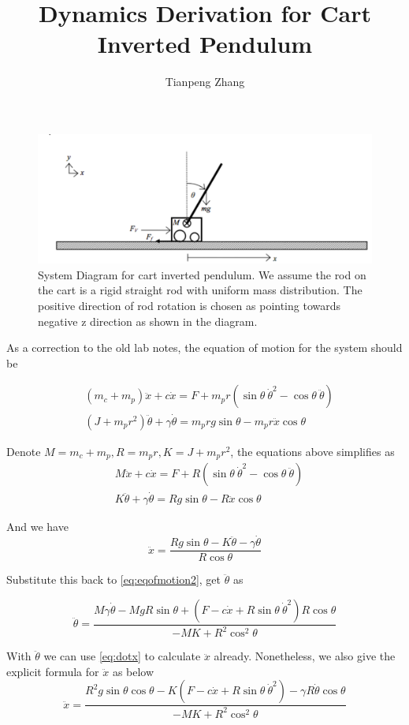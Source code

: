 \documentclass[]{article}
\title{Dynamics Derivation for Cart Inverted Pendulum}
\author{Tianpeng Zhang}
\begin{document}
\maketitle
\begin{figure}[!ht]
	\centering
	\includegraphics[width=0.7\linewidth]{"System Diagram"}
	\caption{System Diagram for cart inverted pendulum. We assume the rod on the cart is a rigid straight rod with uniform mass distribution. The positive direction of rod rotation is chosen as pointing towards negative z direction as shown in the diagram.}
	\label{fig:system-diagram}
\end{figure}

As a correction to the old lab notes, the equation of motion for the system should be

\begin{equation}\label{eq:eqofmotion}
\begin{split}
&(m_c+m_p)\ddot{x}+c\dot{x}=F + m_p r(\sin\theta~ \dot{\theta}^2 - \cos\theta~ \ddot{\theta})\\
& (J+m_p r^2)\ddot{\theta} + \gamma \dot{\theta} = m_p r g \sin\theta - m_p r \ddot{x} \cos\theta
\end{split}
\end{equation}

Denote $M=m_c+m_p, R=m_p r, K = J + m_p r^2$, the equations above simplifies as
\begin{equation}\label{eq:eqofmotion2}
\begin{split}
&M\ddot{x}+c\dot{x}=F +R(\sin\theta~ \dot{\theta}^2 - \cos\theta~ \ddot{\theta})\\
& K\ddot{\theta} + \gamma \dot{\theta} = R g \sin\theta -  R \ddot{x} \cos\theta
\end{split}
\end{equation}

And we have 
\begin{equation}\label{eq:dotx}
	\ddot{x} = \frac{Rg\sin\theta - K \ddot{\theta} -\gamma \dot{\theta}}{R\cos \theta}
\end{equation}

Substitute this back to \eqref{eq:eqofmotion2}, get $\ddot{\theta}$ as

\begin{equation}
	\ddot{\theta} = \frac{M\gamma \dot{\theta}-MgR\sin\theta + (F-c\dot{x} + R\sin\theta~\dot{\theta}^2)R\cos\theta}{-MK+R^2\cos^2\theta}
\end{equation}

With $\ddot{\theta}$ we can use \eqref{eq:dotx} to calculate $\ddot{x}$ already. Nonetheless, we also give the explicit formula for $\ddot{x}$ as below
\begin{equation}\label{eq:explicitddotx}
	\ddot{x} = \frac{R^2 g \sin\theta\cos\theta - K(F-c\dot{x}+R\sin\theta~\dot{\theta}^2)-\gamma R \dot{\theta} \cos\theta}{-MK+R^2\cos^2 \theta}
\end{equation}
\end{document}
